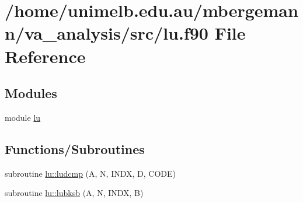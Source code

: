 \hypertarget{lu_8f90}{}\section{/home/unimelb.edu.\+au/mbergemann/va\+\_\+analysis/src/lu.f90 File Reference}
\label{lu_8f90}
\subsection*{Modules}
\begin{DoxyCompactItemize}
\item 
module \hyperlink{namespacelu}{lu}
\end{DoxyCompactItemize}
\subsection*{Functions/\+Subroutines}
\begin{DoxyCompactItemize}
\item 
subroutine \hyperlink{namespacelu_a578a2275703e9c18d7f262f0a3482fbe}{lu\+::ludcmp} (A, N, I\+N\+DX, D, C\+O\+DE)
\item 
subroutine \hyperlink{namespacelu_a588ba20d76e8dd5c49b370d9ba3ec379}{lu\+::lubksb} (A, N, I\+N\+DX, B)
\end{DoxyCompactItemize}
